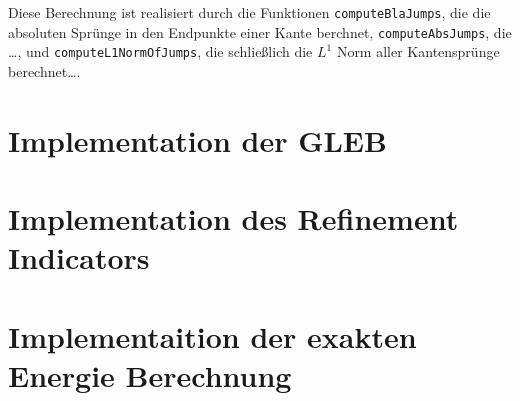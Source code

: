 Diese Berechnung ist realisiert durch die 
Funktionen \texttt{computeBlaJumps}, die die absoluten Sprünge
in den Endpunkte einer Kante berchnet, \texttt{computeAbsJumps}, die \ldots,
und \texttt{computeL1NormOfJumps}, die schließlich die $L^1$ Norm aller
Kantensprünge berechnet\ldots.



\section{Implementation der GLEB}

\section{Implementation des Refinement Indicators}

\section{Implementaition der exakten Energie Berechnung}
